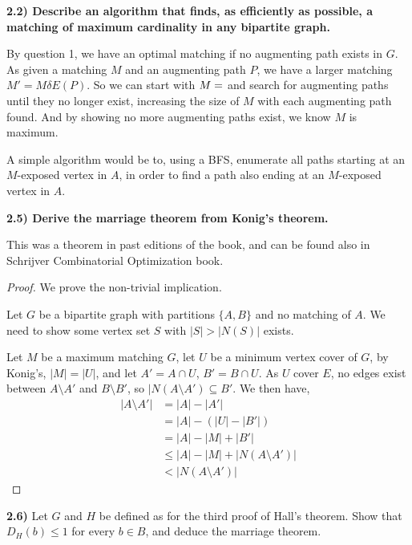 \documentclass[11pt]{article}
\theoremstyle{plain}
\begin{document}
\textbf{2.2) Describe an algorithm that finds, as efficiently as possible, a matching of maximum cardinality in any bipartite graph.}

By question 1, we have an optimal matching if no augmenting path exists in $G$.
As given a matching $M$ and an augmenting path $P$, we have a larger matching $M'=M \delta E(P)$. So we can start with $M=\empty$ and search for augmenting paths until they no longer exist, increasing the size of $M$ with each augmenting path found.
And by showing no more augmenting paths exist, we know $M$ is maximum.

A simple algorithm would be to, using a BFS, enumerate all paths starting at an $M$-exposed vertex in $A$, in order to find a path also ending at an $M$-exposed vertex in $A$. 

\textbf{2.5) Derive the marriage theorem from Konig's theorem.}

This was a theorem in past editions of the book, and can be found also in Schrijver Combinatorial Optimization book.

\begin{proof}
We prove the non-trivial implication.

Let $G$ be a bipartite graph with partitions $\{A,B\}$ and no matching of $A$. We need to show some vertex set $S$ with $|S|>|N(S)|$ exists. 

Let $M$ be a maximum matching $G$, let $U$ be a minimum vertex cover of $G$, by Konig's, $|M| = |U|$, and let $A' = A \cap U$, $B' = B \cap U$. As $U$ cover $E$, no edges exist between $A\setminus A'$ and $B\setminus B'$, so $|N(A \setminus A') \subseteq B'$. We then have,
\begin{align*}
|A\setminus A'| & = |A| - |A'| \\
& = |A| - (|U| - |B'|) \\
& = |A| - |M| + |B'| \\
& \leq |A| - |M| + |N(A \setminus A')| \\
& < |N(A \setminus A')|
\end{align*}
\end{proof}

\textbf{2.6)} Let $G$ and $H$ be defined as for the third proof of Hall's theorem. Show that $D_H(b) \leq 1$ for every $b \in B$, and deduce the marriage theorem.
\end{document}
